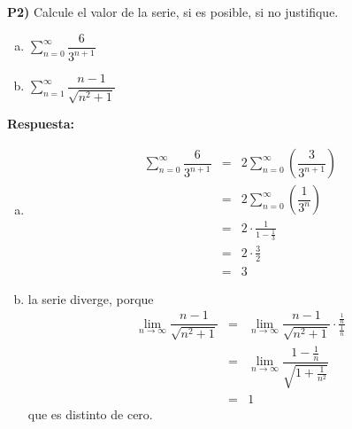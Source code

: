 \documentclass{article}
\begin{document}
\newpage
\noindent\textbf{P2) } Calcule el valor de la serie, si es posible, si no justifique.
\begin{enumerate}[a)]
  \item $\displaystyle\sum_{n=0}^{\infty}\dfrac{6}{3^{n+1}}$
  \item $\displaystyle\sum_{n=1}^{\infty}\dfrac{n-1}{\sqrt{n^2+1}}$
\end{enumerate}

\vspace{5mm}
\noindent\textbf{Respuesta:}
\begin{enumerate}[a)]
  \item 
    \begin{eqnarray*}
      \sum_{n=0}^{\infty}\dfrac{6}{3^{n+1}}
        &=& 2\sum_{n=0}^{\infty}\left(\dfrac{3}{3^{n+1}}\right)\\
        &=& 2\sum_{n=0}^{\infty}\left(\dfrac{1}{3^n}\right)\\
        &=& 2\cdot\frac{1}{1-\frac{1}{3}}\\
        &=& 2\cdot\frac{3}{2}\\
        &=& 3
    \end{eqnarray*}
  \item la serie diverge, porque
    \begin{eqnarray*}
      \lim_{n\to\infty}\dfrac{n-1}{\sqrt{n^2+1}}
        &=& \lim_{n\to\infty}\dfrac{n-1}{\sqrt{n^2+1}}\cdot\frac{\frac{1}{n}}{\frac{1}{n}}\\
        &=& \lim_{n\to\infty}\dfrac{1-\frac{1}{n}}{\sqrt{1+\frac{1}{n^2}}}\\
        &=& 1
    \end{eqnarray*}
    que es distinto de cero.
\end{enumerate}
\end{document}
